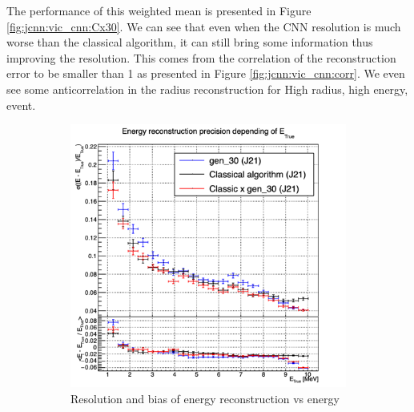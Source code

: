\documentclass[../main.tex]{subfiles}
\begin{document}
{{The performance of this weighted mean is presented in Figure \ref{fig:jcnn:vic_cnn:Cx30}. We can see that even when the CNN resolution is much worse than the classical algorithm, it can still bring some information thus improving the resolution. This comes from the correlation of the reconstruction error to be smaller than 1 as presented in Figure \ref{fig:jcnn:vic_cnn:corr}. We even see some anticorrelation in the radius reconstruction for High radius, high energy, event.


\begin{figure}[ht]
  \centering
  \begin{subfigure}[t]{0.32\linewidth}
    \centering
    \includegraphics[width=\linewidth]{images/jcnn/vic_cnn/multi_vic_cnn_Cx30_MESBvETC.png}
    \caption{Resolution and bias of energy reconstruction vs energy}
    \label{fig:jcnn:vic_cnn:multi_vic_cnn_Cx30_MESBvETC}
  \end{subfigure}
  \begin{subfigure}[t]{0.32\linewidth}
    \centering

\end{subfigure}
\end{figure}}}
\end{document}

